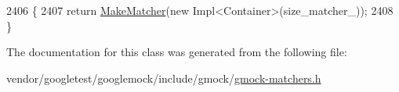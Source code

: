 \begin{DoxyCode}
2406                                       \{
2407     \textcolor{keywordflow}{return} \hyperlink{namespacetesting_a37fd8029ac00e60952440a3d9cca8166}{MakeMatcher}(\textcolor{keyword}{new} Impl<Container>(size\_matcher\_));
2408   \}
\end{DoxyCode}


The documentation for this class was generated from the following file\+:\begin{DoxyCompactItemize}
\item 
vendor/googletest/googlemock/include/gmock/\hyperlink{gmock-matchers_8h}{gmock-\/matchers.\+h}\end{DoxyCompactItemize}
